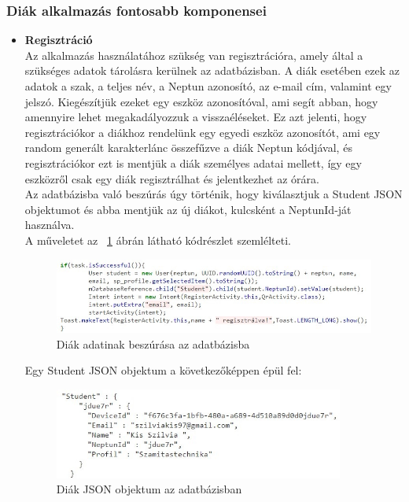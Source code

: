 \documentclass[12pt]{article}
\numberwithin{figure}{section}
\numberwithin{equation}{section}
\begin{document}
\subsubsection{Diák alkalmazás fontosabb komponensei}
\begin{itemize}
	\item \textbf{Regisztráció}\\
	Az alkalmazás használatához szükség van regisztrációra, amely által a szükséges adatok tárolásra kerülnek az adatbázisban.
	A diák esetében ezek az adatok a szak, a teljes név, a Neptun azonosító, az e-mail cím, valamint egy jelszó. Kiegészítjük ezeket egy eszköz azonosítóval, ami segít abban, hogy amennyire lehet megakadályozzuk a visszaéléseket. Ez azt jelenti, hogy regisztrációkor a diákhoz rendelünk egy egyedi eszköz azonosítót, ami egy random generált karakterlánc összefűzve a diák Neptun kódjával, és regisztrációkor ezt is mentjük a diák személyes adatai mellett, így egy eszközről csak egy diák regisztrálhat és jelentkezhet az órára.\\
	Az adatbázisba való beszúrás úgy történik, hogy kiválasztjuk a Student JSON objektumot és abba mentjük az új diákot, kulcsként a NeptunId-ját használva.\\
	A műveletet az ~\ref{fig:diak_reg} ábrán látható kódrészlet szemlélteti. \\
		
	\begin{figure}[H]
		\centering
		\includegraphics[width=400px]{student_reg2.jpg}
		\caption{Diák adatinak beszúrása az adatbázisba}
		\label{fig:diak_reg}
	\end{figure}

\hfill \break

	Egy Student JSON objektum a következőképpen épül fel:
	
	\begin{figure}[H]
		\centering
		\includegraphics[width=360px]{student_json2.jpg}
		\caption{Diák JSON objektum az adatbázisban}
	\end{figure}


\end{itemize}
\end{document}
